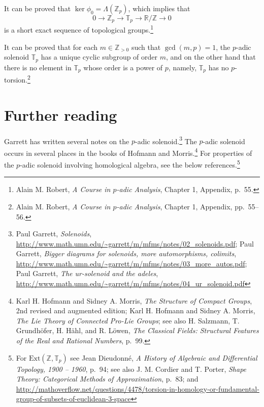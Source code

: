 \documentclass{article}
\theoremstyle{definition}
\begin{document}
It can be proved that $\ker \phi_0 = \Lambda(\mathbb{Z}_p)$, which implies that
\[
0 \to \mathbb{Z}_p \to \mathbb{T}_p \to \mathbb{R}/\mathbb{Z} \to 0
\]
is a short exact sequence of topological groups.\footnote{Alain M. Robert, {\em A Course in $p$-adic Analysis},
Chapter 1, Appendix, p.~55.} 

It can be proved that for each $m \in \mathbb{Z}_{>0}$ such that $\gcd(m,p)=1$, the $p$-adic solenoid $\mathbb{T}_p$ has a unique cyclic subgroup of order $m$,
and on the other hand that there is no element in $\mathbb{T}_p$ whose order is a power of $p$, namely, $\mathbb{T}_p$ has no $p$-torsion.\footnote{Alain M. Robert, {\em A Course in $p$-adic Analysis},
Chapter 1, Appendix, pp.~55--56.} 



\section{Further reading}
Garrett has written several notes on the $p$-adic solenoid.\footnote{Paul Garrett, {\em Solenoids}, \url{http://www.math.umn.edu/~garrett/m/mfms/notes/02_solenoids.pdf};
Paul Garrett, {\em Bigger diagrams for solenoids, more automorphisms, colimits}, \url{http://www.math.umn.edu/~garrett/m/mfms/notes/03_more_autos.pdf};
Paul Garrett, {\em The ur-solenoid and the adeles}, \url{http://www.math.umn.edu/~garrett/m/mfms/notes/04_ur_solenoid.pdf}}
The $p$-adic solenoid occurs in several places in the books of Hofmann and Morris.\footnote{Karl H. Hofmann and Sidney A. Morris, {\em The Structure of Compact
Groups}, 2nd revised and augmented edition; Karl H. Hofmann and Sidney A. Morris, {\em The Lie Theory of Connected
Pro-Lie Groups}; see also H. Salzmann, T. Grundh\"ofer, H. H\"ahl, and R. L\"owen, {\em The Classical Fields: Structural Features of the Real and Rational Numbers},
p.~99.}
For properties of the $p$-adic solenoid involving homological algebra, see the below references.\footnote{For $\mathrm{Ext}(\mathbb{Z},\mathbb{T}_p)$ see Jean Dieudonn\'e,
{\em A History of Algebraic and Differential Topology, 1900 -- 1960}, p.~94; see also
J. M. Cordier and T. Porter, {\em Shape Theory: Categorical Methods of Approximation}, p.~83; and \url{http://mathoverflow.net/questions/4478/torsion-in-homology-or-fundamental-group-of-subsets-of-euclidean-3-space}}
\end{document}
